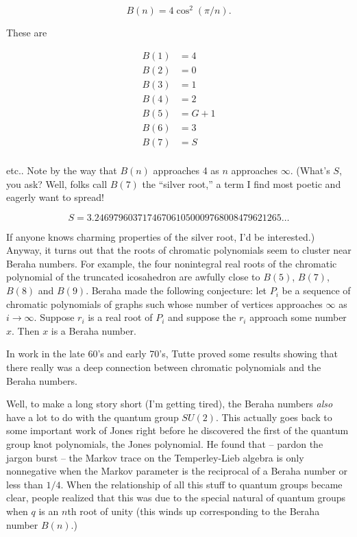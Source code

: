 \documentclass{article}
\begin{document}
\[B(n) = 4 \cos^2(\pi/n).\]

These are

\[\begin{aligned}B(1) &= 4 \\ B(2) &= 0 \\ B(3) &= 1 \\ B(4) &= 2 \\ B(5) &= G+1 \\ B(6) &= 3 \\ B(7) &= S \\ \end{aligned}\]

etc.. Note by the way that \(B(n)\) approaches 4 as \(n\) approaches
\(\infty\). (What's \(S\), you ask? Well, folks call \(B(7)\) the
``silver root,'' a term I find most poetic and eagerly want to spread!

\[S =  3.246979603717467061050009768008479621265\ldots\]

If anyone knows charming properties of the silver root, I'd be
interested.) Anyway, it turns out that the roots of chromatic
polynomials seem to cluster near Beraha numbers. For example, the four
nonintegral real roots of the chromatic polynomial of the truncated
icosahedron are awfully close to \(B(5)\), \(B(7)\), \(B(8)\) and
\(B(9)\). Beraha made the following conjecture: let \(P_i\) be a
sequence of chromatic polynomials of graphs such whose number of
vertices approaches \(\infty\) as \(i\to\infty\). Suppose \(r_i\) is a
real root of \(P_i\) and suppose the \(r_i\) approach some number \(x\).
Then \(x\) is a Beraha number.

In work in the late 60's and early 70's, Tutte proved some results
showing that there really was a deep connection between chromatic
polynomials and the Beraha numbers.

Well, to make a long story short (I'm getting tired), the Beraha numbers
\emph{also} have a lot to do with the quantum group \(SU(2)\). This
actually goes back to some important work of Jones right before he
discovered the first of the quantum group knot polynomials, the Jones
polynomial. He found that -- pardon the jargon burst -- the Markov trace
on the Temperley-Lieb algebra is only nonnegative when the Markov
parameter is the reciprocal of a Beraha number or less than \(1/4\).
When the relationship of all this stuff to quantum groups became clear,
people realized that this was due to the special natural of quantum
groups when \(q\) is an \(n\)th root of unity (this winds up
corresponding to the Beraha number \(B(n)\).)
\end{document}
